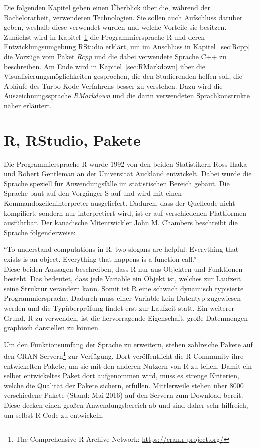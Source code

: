 Die folgenden Kapitel geben einen Überblick über die, während der Bachelorarbeit, verwendeten Technologien. Sie sollen auch Aufschluss darüber geben, weshalb diese verwendet wurden und welche Vorteile sie besitzen. Zunächst wird in Kapitel~\ref{sec:R} die Programmiersprache R und deren Entwicklungsumgebung RStudio erklärt, um im Anschluss in Kapitel~\ref{sec:Rcpp} die Vorzüge vom Paket \emph{Rcpp} und die dabei verwendete Sprache C++ zu beschreiben. Am Ende wird in Kapitel~\ref{sec:RMarkdown} über die Visualisierungsmöglichkeiten gesprochen, die den Studierenden helfen soll, die Abläufe des Turbo-Kode-Verfahrens besser zu verstehen. Dazu wird die Auszeichnungssprache \emph{RMarkdown} und die darin verwendeten Sprachkonstrukte näher erläutert.

\section{R, RStudio, Pakete}
\label{sec:R}
Die Programmiersprache R wurde 1992 von den beiden Statistikern  Ross Ihaka und Robert Gentleman an der Universität Auckland entwickelt. Dabei wurde die Sprache speziell für Anwendungsfälle im statistischen Bereich gebaut. Die Sprache baut auf den Vorgänger S auf und wird mit einen Kommandozeileninterpreter ausgeliefert. Dadurch, dass der Quellcode nicht kompiliert, sondern nur interpretiert wird, ist er auf verschiedenen Plattformen ausführbar. Der kanadische Mitentwickler John M. Chambers beschreibt die Sprache folgenderweise:

\enquote{To understand computations in R, two slogans are helpful: Everything that exists is an object. Everything that happens is a function call.}~\cite{chambers2014object}\\

Diese beiden Aussagen beschreiben, dass R nur aus Objekten und Funktionen besteht. Das bedeutet, dass jede Variable ein Objekt ist, welches zur Laufzeit seine Struktur verändern kann. Somit ist R eine schwach dynamisch typisierte Programmiersprache. Dadurch muss einer Variable kein Datentyp zugewiesen werden und die Typüberprüfung findet erst zur Laufzeit statt. Ein weiterer Grund, R zu verwenden, ist die hervorragende Eigenschaft, große Datenmengen graphisch darstellen zu können.

Um den Funktionsumfang der Sprache zu erweitern, stehen zahlreiche Pakete auf den CRAN-Servern\footnote{The Comprehensive R Archive Network: \url{https://cran.r-project.org/}} zur Verfügung. Dort veröffentlicht die R-Community ihre entwickelten Pakete, um sie mit den anderen Nutzern von R zu teilen. Damit ein selber entwickeltes Paket dort aufgenommen wird, muss es strenge Kriterien, welche die Qualität der Pakete sichern, erfüllen. Mittlerweile stehen über 8000 verschiedene Pakete (Stand: Mai 2016) auf den Servern zum Download bereit. Diese decken einen großen Anwendungsbereich ab und sind daher sehr hilfreich, um selbst R-Code zu entwickeln.~\cite{rmanual}

